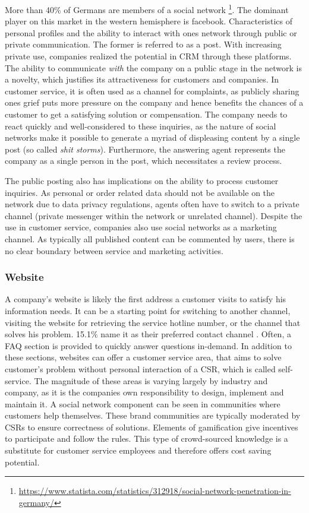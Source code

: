 		More than 40\% of Germans are members of a social network \footnote{\cf \url{https://www.statista.com/statistics/312918/social-network-penetration-in-germany/}}. The dominant player on this market in the western hemisphere is facebook. Characteristics of personal profiles and the ability to interact with ones network through public or private communication. The former is referred to as a post. With increasing private use, companies realized the potential in \acrshort{CRM} through these platforms. The ability to communicate \textit{with} the company on a public stage in the network is a novelty, which justifies its attractiveness for customers and companies. In customer service, it is often used as a channel for complaints, as publicly sharing ones grief puts more pressure on the company and hence benefits the chances of a customer to get a satisfying solution or compensation. The company needs to react quickly and well-considered to these inquiries, as the nature of social networks make it possible to generate a myriad of displeasing content by a single post (so called \textit{shit storms}). Furthermore, the answering agent represents the company as a single person in the post, which necessitates a review process. 
		
		The public posting also has implications on the ability to process customer inquiries. As personal or order related data should not be available on the network due to data privacy regulations, agents often have to switch to a private channel (\ie private messenger within the network or unrelated channel). Despite the use in customer service, companies also use social networks as a marketing channel. As typically all published content can be commented by users, there is no clear boundary between service and marketing activities. 
		
		
		\subsubsection{Website}
		
		A company's website is likely the first address a customer visits to satisfy his information needs. It can be a starting point for switching to another channel, \ie visiting the website for retrieving the service hotline number, or the channel that solves his problem. 15.1\% name it as their preferred contact channel \citep{Agnischock2015}. Often, a \acrfull{FAQ} section is provided to quickly answer questions in-demand. In addition to these sections, websites can offer a customer service area, that aims to solve customer's problem without personal interaction of a \acrshort{CSR}, which is called self-service. The magnitude of these areas is varying largely by industry and company, as it is the companies own responsibility to design, implement and maintain it. A social network component can be seen in communities where customers help themselves. These brand communities \citep{Hsieh_2017} are typically moderated by \acrshort{CSR}s to ensure correctness of solutions. Elements of gamification give incentives to participate and follow the rules. This type of crowd-sourced knowledge is a substitute for customer service employees and therefore offers cost saving potential. 
		
